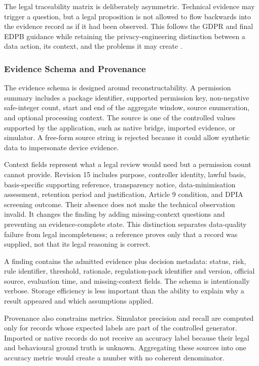 The legal traceability matrix is deliberately asymmetric. Technical evidence may trigger a question, but a legal proposition is not allowed to flow backwards into the evidence record as if it had been observed. This follows the GDPR and final EDPB guidance while retaining the privacy-engineering distinction between a data action, its context, and the problems it may create \cite{eurlex2016,edpb2019,nist8062}.

\subsubsection{Evidence Schema and Provenance}

The evidence schema is designed around reconstructability. A permission summary includes a package identifier, supported permission key, non-negative safe-integer count, start and end of the aggregate window, source enumeration, and optional processing context. The source is one of the controlled values supported by the application, such as native bridge, imported evidence, or simulator. A free-form source string is rejected because it could allow synthetic data to impersonate device evidence.

Context fields represent what a legal review would need but a permission count cannot provide. Revision 15 includes purpose, controller identity, lawful basis, basis-specific supporting reference, transparency notice, data-minimisation assessment, retention period and justification, Article 9 condition, and DPIA screening outcome. Their absence does not make the technical observation invalid. It changes the finding by adding missing-context questions and preventing an evidence-complete state. This distinction separates data-quality failure from legal incompleteness; a reference proves only that a record was supplied, not that its legal reasoning is correct.

A finding contains the admitted evidence plus decision metadata: status, risk, rule identifier, threshold, rationale, regulation-pack identifier and version, official source, evaluation time, and missing-context fields. The schema is intentionally verbose. Storage efficiency is less important than the ability to explain why a result appeared and which assumptions applied.

Provenance also constrains metrics. Simulator precision and recall are computed only for records whose expected labels are part of the controlled generator. Imported or native records do not receive an accuracy label because their legal and behavioural ground truth is unknown. Aggregating these sources into one accuracy metric would create a number with no coherent denominator.

